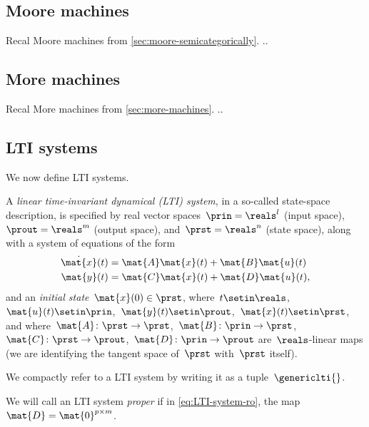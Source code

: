 \subsection{Moore machines}

Recal Moore machines from \cref{sec:moore-semicategorically}.
..

\subsection{More machines}

Recal More machines from \cref{sec:more-machines}.
..

\subsection{LTI systems}

We now define LTI systems.

\begin{definition}
    \label{def:LTI_syst}
    A \emph{linear time-invariant dynamical (LTI) system}, in a so-called state-space description, is specified by real vector spaces~$\prin=\reals^l$ (input space),~$\prout=\reals^m$ (output space), and~$\prst=\reals^n$ (state space), along with a system of equations of the form
    \begin{align}
        \dot{\mat{x}}(t) & = \mat{A}\mat{x}(t) + \mat{B}\mat{u}(t) \label{eq:LTI-system-dyn} \\
        \mat{y}(t)       & = \mat{C}\mat{x}(t) + \mat{D}\mat{u}(t) \label{eq:LTI-system-ro},
    \end{align}
    and an \emph{initial state}~$\mat{x}(0)\in \prst$, where~$t \setin \reals$,~$\mat{u}(t) \setin \prin$,~$\mat{y}(t) \setin \prout$,~$\mat{x}(t) \setin \prst$, and where~$\mat{A}\colon \prst \to \prst$,~$\mat{B}\colon \prin \to \prst$,~$\mat{C}\colon \prst \to \prout$,~$\mat{D}\colon \prin \to \prout$ are~$\reals$-linear maps (we are identifying the tangent space of~$\prst$ with~$\prst$ itself).
\end{definition}

We compactly refer to a LTI system by writing it as a tuple~$\genericlti{}$.

We will call an LTI system \emph{proper} if in \cref{eq:LTI-system-ro}, the map~$\mat{D}=\mat{0}^{p \times m}$.

